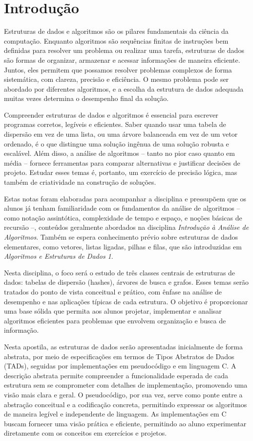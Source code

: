 \chapter{Introdução}

Estruturas de dados e algoritmos são os pilares fundamentais da ciência da computação. 
Enquanto algoritmos são sequências finitas de instruções bem definidas para resolver um problema ou realizar uma tarefa, estruturas de dados são formas de organizar, armazenar e acessar informações de maneira eficiente. 
Juntos, eles permitem que possamos resolver problemas complexos de forma sistemática, com clareza, precisão e eficiência. 
O mesmo problema pode ser abordado por diferentes algoritmos, e a escolha da estrutura de dados adequada muitas vezes determina o desempenho final da solução.

Compreender estruturas de dados e algoritmos é essencial para escrever programas corretos, legíveis e eficientes. 
Saber quando usar uma tabela de dispersão em vez de uma lista, ou uma árvore balanceada em vez de um vetor ordenado, é o que distingue uma solução ingênua de uma solução robusta e escalável. 
Além disso, a análise de algoritmos -- tanto no pior caso quanto em média -- fornece ferramentas para comparar alternativas e justificar decisões de projeto. 
Estudar esses temas é, portanto, um exercício de precisão lógica, mas também de criatividade na construção de soluções.

Estas notas foram elaboradas para acompanhar a disciplina e pressupõem que os alunos já tenham familiaridade com os fundamentos da análise de algoritmos -- como notação assintótica, complexidade de tempo e espaço, e noções básicas de recursão --, conteúdos geralmente abordados na disciplina {\em Introdução à Análise de Algoritmos}. 
Também se espera conhecimento prévio sobre estruturas de dados elementares, como vetores, listas ligadas, pilhas e filas, que são introduzidas em {\em Algoritmos e Estruturas de Dados 1}.

Nesta disciplina, o foco será o estudo de três classes centrais de estruturas de dados: tabelas de dispersão (hashes), árvores de busca e grafos. 
Esses temas serão tratados do ponto de vista conceitual e prático, com ênfase na análise de desempenho e nas aplicações típicas de cada estrutura. 
O objetivo é proporcionar uma base sólida que permita aos alunos projetar, implementar e analisar algoritmos eficientes para problemas que envolvem organização e busca de informação.

Nesta apostila, as estruturas de dados serão apresentadas inicialmente de forma abstrata, por meio de especificações em termos de Tipos Abstratos de Dados (TADs), seguidas por implementações em pseudocódigo e em linguagem C. 
A descrição abstrata permite compreender a funcionalidade esperada de cada estrutura sem se comprometer com detalhes de implementação, promovendo uma visão mais clara e geral. 
O pseudocódigo, por sua vez, serve como ponte entre a abstração conceitual e a codificação concreta, permitindo expressar os algoritmos de maneira legível e independente de linguagem. 
As implementações em C buscam fornecer uma visão prática e eficiente, permitindo ao aluno experimentar diretamente com os conceitos em exercícios e projetos.


